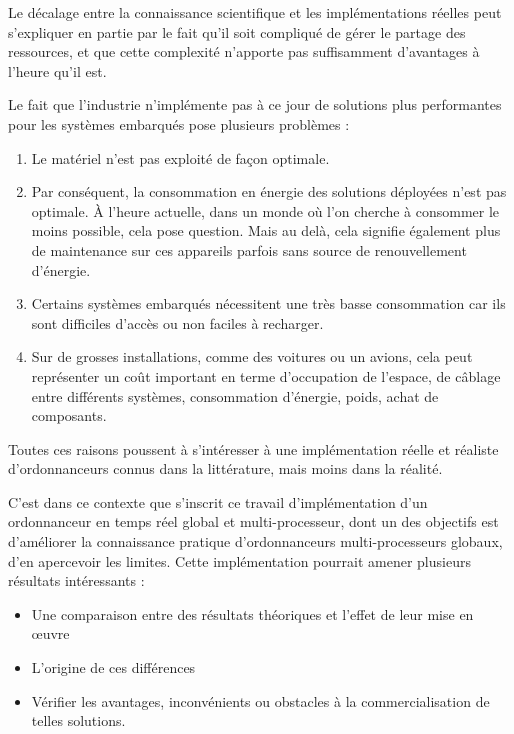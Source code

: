 \documentclass[11pt,a4paper,oneside]{report}
\begin{document}
	Le décalage entre la connaissance scientifique et les implémentations réelles 
	peut s'expliquer en partie par le fait qu'il soit compliqué de gérer le partage des ressources, 
	et que cette complexité n'apporte pas suffisamment d'avantages à l'heure qu'il est.\medskip
	
	Le fait que l'industrie n'implémente pas à ce jour de solutions plus \og performantes \fg{} 
	pour les systèmes embarqués pose plusieurs problèmes :
	\begin{enumerate}
		\item Le matériel n'est pas exploité de façon optimale.
		\item Par conséquent, la consommation en énergie des solutions déployées n'est 
		pas optimale.
		À l'heure actuelle, dans un monde où l'on cherche à consommer le moins possible, 
		cela pose question. Mais au delà, cela signifie également plus de maintenance 
		sur ces appareils parfois sans source de renouvellement d'énergie.
		\item Certains systèmes embarqués nécessitent une très basse consommation car 
		ils sont difficiles d'accès ou non faciles à recharger.
		\item Sur de grosses installations, comme des voitures ou un avions, cela peut représenter 
		un coût important en terme d'occupation de l'espace, de câblage entre différents systèmes, 
		consommation d'énergie, poids, achat de composants.
	\end{enumerate}
	
	Toutes ces raisons poussent à s'intéresser à une implémentation réelle et réaliste 
	d'ordonnanceurs connus dans la littérature, mais moins dans la réalité.
	
	C'est dans ce contexte que s'inscrit ce travail d'implémentation d'un ordonnanceur en temps réel 
	global et multi-processeur, dont un des objectifs est d'améliorer la connaissance pratique 
	d'ordonnanceurs multi-processeurs globaux, d'en apercevoir les limites. 
	Cette implémentation pourrait amener plusieurs résultats intéressants : \medskip
	\begin{itemize}
		\item Une comparaison entre des résultats théoriques et l'effet de leur mise 
		en \oe{}uvre
		\item L'origine de ces différences
		\item Vérifier les avantages, inconvénients ou obstacles à la 
		commercialisation de telles solutions.
	\end{itemize}
	
\end{document}
